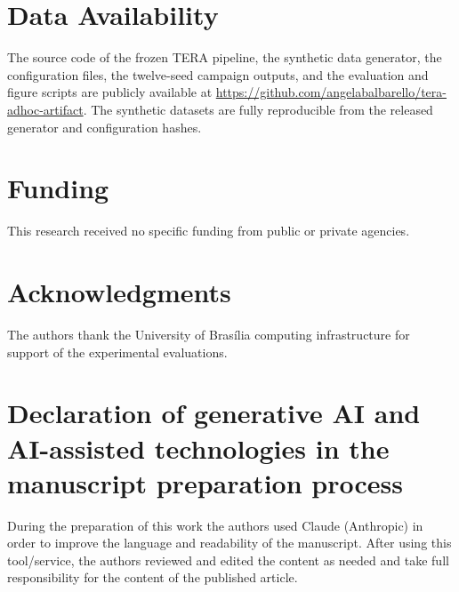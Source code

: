 \documentclass[a4paper,fleqn]{cas-dc}
\begin{document}
\section*{Data Availability}
{\color{\revcolor}The source code of the frozen TERA pipeline, the synthetic data generator, the
configuration files, the twelve-seed campaign outputs, and the evaluation and
figure scripts are publicly available at
\url{https://github.com/angelabalbarello/tera-adhoc-artifact}. The synthetic
datasets are fully reproducible from the released generator and configuration
hashes.}
\section*{Funding}
This research received no specific funding from public or private agencies.
\section*{Acknowledgments}
The authors thank the University of Bras\'ilia computing infrastructure
for support of the experimental evaluations.
\begin{sloppypar}
\section*{Declaration of generative AI and AI-assisted technologies in the
manuscript preparation process}
{\color{\revcolor}During the preparation of this work the authors used Claude
(Anthropic) in order to improve the language and readability of the
manuscript. After using this tool/service, the authors reviewed and edited
the content as needed and take full responsibility for the content of the
published article.}
\end{sloppypar}


\end{document}
